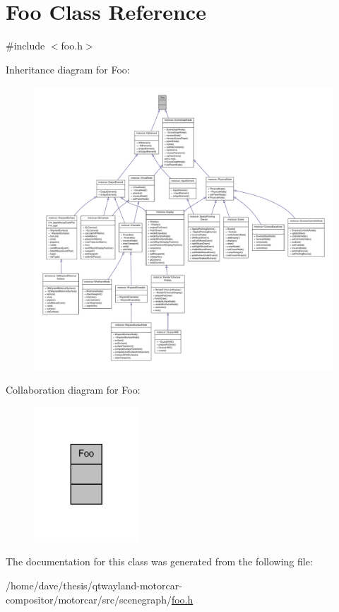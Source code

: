 \hypertarget{classFoo}{\section{Foo Class Reference}
\label{classFoo}
}


{\ttfamily \#include $<$foo.\-h$>$}



Inheritance diagram for Foo\-:
\nopagebreak
\begin{figure}[H]
\begin{center}
\leavevmode
\includegraphics[width=350pt]{classFoo__inherit__graph}
\end{center}
\end{figure}


Collaboration diagram for Foo\-:
\nopagebreak
\begin{figure}[H]
\begin{center}
\leavevmode
\includegraphics[width=112pt]{classFoo__coll__graph}
\end{center}
\end{figure}


The documentation for this class was generated from the following file\-:\begin{DoxyCompactItemize}
\item 
/home/dave/thesis/qtwayland-\/motorcar-\/compositor/motorcar/src/scenegraph/\hyperlink{foo_8h}{foo.\-h}\end{DoxyCompactItemize}
